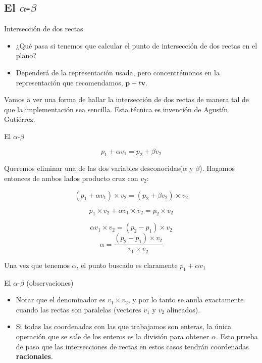 \documentclass[compress]{beamer}
\begin{document}
\subsection{El $\alpha$-$\beta$}

\begin{frame}{Intersección de dos rectas}

\begin{itemize}
    \item ¿Qué pasa si tenemos que calcular el punto de intersección de dos rectas en el plano?
    \item Dependerá de la representación usada, pero concentrémonos en la representación que recomendamos, $\mathbf{p} + t\mathbf{v}$.
\end{itemize}

Vamos a ver una forma de hallar la intersección de dos rectas
de manera tal de que la implementación sea sencilla. Esta técnica es
invención de Agustín Gutiérrez.

\end{frame}

\begin{frame}{El $\alpha$-$\beta$}

    $$p_1 + \alpha v_1 = p_2 + \beta v_2$$
    
    Queremos eliminar una de las dos variables desconocidas($\alpha$ y $\beta$). Hagamos entonces de ambos lados producto cruz con $v_2$:
    
    $$(p_1 + \alpha v_1) \times v_2 = (p_2 + \beta v_2) \times v_2$$
    
    $$p_1 \times v_2 + \alpha v_1 \times v_2 = p_2  \times v_2$$
    
    $$\alpha v_1 \times v_2 = (p_2 - p_1)  \times v_2$$
    $$\alpha = \frac{(p_2 - p_1)  \times v_2}{v_1 \times v_2}$$

Una vez que tenemos $\alpha$, el punto buscado es claramente $p_1 + \alpha v_1$

\end{frame}    

\begin{frame}{El $\alpha$-$\beta$ (observaciones)}

    \begin{itemize}
        \item Notar que el denominador es $v_1 \times v_2$, y por lo tanto se anula exactamente cuando las rectas son paralelas (vectores $v_1$ y $v_2$ alineados).
        \item Si todas las coordenadas con las que trabajamos son enteras, la única operación que se sale de los enteros es la división para obtener $\alpha$. Esto prueba de paso que las intersecciones de rectas en estos casos tendrán coordenadas \textbf{racionales}.
    \end{itemize}

\end{frame}    
\end{document}
